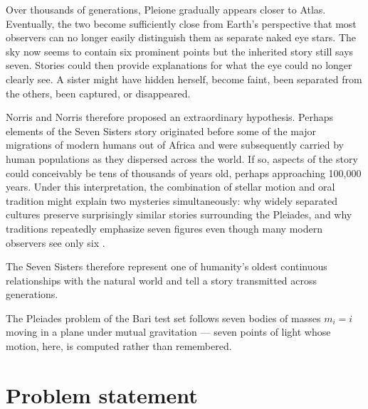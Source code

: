 \documentclass[11pt]{article}
\begin{document}
Over thousands of generations, Pleione gradually appears closer to Atlas.
Eventually, the two become sufficiently close from Earth's perspective that most
observers can no longer easily distinguish them as separate naked eye stars. The
sky now seems to contain six prominent points but the inherited story still
says seven. Stories could then provide explanations for what the eye could no longer clearly
see. A sister might have hidden herself, become faint, been separated from the
others, been captured, or disappeared. 


Norris and Norris therefore proposed an extraordinary hypothesis. Perhaps
elements of the Seven Sisters story originated before some of the major
migrations of modern humans out of Africa and were subsequently carried by human
populations as they dispersed across the world. If so, aspects of the story
could conceivably be tens of thousands of years old, perhaps approaching 100,000
years. Under this interpretation, the combination of stellar motion and oral
tradition might explain two mysteries simultaneously: why widely separated
cultures preserve surprisingly similar stories surrounding the Pleiades, and why
traditions repeatedly emphasize seven figures even though many modern observers
see only six \cite{norris2021}.



The Seven Sisters therefore represent one of humanity's
oldest continuous relationships with the natural world and tell a story transmitted
across generations.

The Pleiades problem of the Bari test set follows
seven bodies of masses $m_i = i$ moving in a plane under mutual gravitation ---
seven points of light whose motion, here, is computed rather than remembered.

\section{Problem statement}
\end{document}
